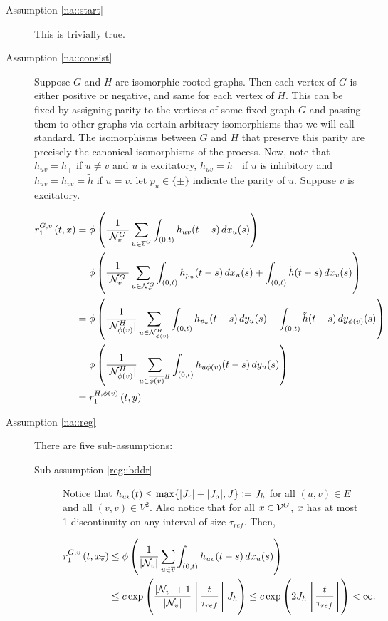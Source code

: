 \begin{description}
\item[Assumption \ref{na::start}] This is trivially true.

\item[Assumption \ref{na::consist}] Suppose \(G\) and \(H\) are isomorphic rooted graphs. Then each vertex of \(G\) is either positive or negative, and same for each vertex of \(H\). This can be fixed by assigning parity to the vertices of some fixed graph \(G\) and passing them to other graphs via certain arbitrary isomorphisms that we will call standard. The isomorphisms between \(G\) and \(H\) that preserve this parity are precisely the canonical isomorphisms of the process. Now, note that \(h_{uv} = h_+\) if \(u \neq v\) and \(u\) is excitatory, \(h_{uv} = h_-\) if \(u\) is inhibitory and \(h_{uv} = h_{vv} = \tilde{h}\) if \(u= v\). let \(p_u \in \{\pm\}\) indicate the parity of \(u\). Suppose \(v\) is excitatory.

\begin{align*}
\rate\gvpara{G}{v}\stpara{1}\tmepro{t}{\xf}{} &= \phi\left(\frac{1}{|\gneigh{G}{v}|}\sum_{u\in\cl{v}\gind{G}} \int_{(0,t)} h_{uv}(t-s)\,d\xf_u(s)\right)\\
&=\phi\left(\frac{1}{|\gneigh{G}{v}|}\sum_{u\in\gneigh{G}{v}} \int_{(0,t)} h_{p_u}(t-s)\,d\xf_u(s) + \int_{(0,t)}\tilde{h}(t-s)\,d\xf_v(s)\right)\\
&= \phi\left(\frac{1}{|\gneigh{H}{\phi(v)}|}\sum_{u\in\gneigh{H}{\phi(v)}} \int_{(0,t)} h_{p_u}(t-s)\,d\xg_u(s) + \int_{(0,t)}\tilde{h}(t-s)\,d\xg_{\phi(v)}(s)\right)\\
&=\phi\left(\frac{1}{|\gneigh{H}{\phi(v)}|}\sum_{u\in\cl{\phi(v)}\gind{H}} \int_{(0,t)} h_{u\phi(v)}(t-s)\,d\xg_u(s)\right)\\
&=\rate\gvpara{H}{\phi(v)}\stpara{1}\tmepro{t}{\xg}{}
\end{align*}

\item[Assumption \ref{na::reg}] There are five sub-assumptions:

\begin{description}
\item[Sub-assumption \ref{reg::bddr}]

Notice that \(h_{uv}(t) \leq \max\{|J_r| + |J_a|, J\} := J_h\) for all \((u,v) \in E\) and all \((v,v) \in V^2\). Also notice that for all \(x\in\mathcal{V}^{G}\), \(x\) has at most 1 discontinuity on any interval of size \(\tau_{ref}\). Then,

\begin{align*}
\rate\gvpara{G}{v}\stpara{1}\tmepro{t}{\xf\vind{\cl{v}}}{} &\leq \phi\left(\frac{1}{|\neigh{v}|}\sum_{u\in\cl{v}}\int_{(0,t)} h_{uv}(t-s)\,d\xf\vind{u}(s)\right)\\
&\leq c\exp\left(\frac{|\neigh{v}|+1}{|\neigh{v}|}\left\lceil\frac{t}{\tau_{ref}}\right\rceil J_h\right) \leq c\exp\left(2J_h\left\lceil\frac{t}{\tau_{ref}}\right\rceil\right) <\infty.
\end{align*}


\end{description}
\end{description}
